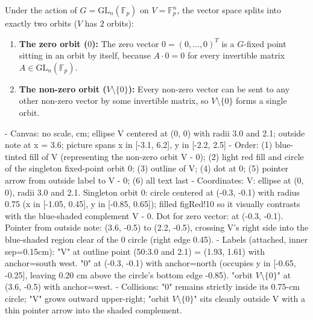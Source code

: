 \begin{content}
Under the action of $G = \mathrm{GL}_n(\mathbb{F}_p)$ on $V = \mathbb{F}_p^n$, the vector space splits into exactly two orbits ($V$ has $2$ orbits):
\begin{enumerate}[label=\textbf{\arabic*.}]
    \item \textbf{The zero orbit ($0$):} The zero vector $0 = (0, \dots, 0)^T$ is a $G$-fixed point sitting in an orbit by itself, because $A \cdot 0 = 0$ for every invertible matrix $A \in \mathrm{GL}_n(\mathbb{F}_p)$.
    \item \textbf{The non-zero orbit ($V \setminus \{0\}$):} Every non-zero vector can be sent to any other non-zero vector by some invertible matrix, so $V \setminus \{0\}$ forms a single orbit.
\end{enumerate}

\begin{hidden}
- Canvas: no scale, cm; ellipse V centered at (0, 0) with radii 3.0 and 2.1; outside note at x = 3.6; picture spans x in [-3.1, 6.2], y in [-2.2, 2.5]
- Order: (1) blue-tinted fill of V (representing the non-zero orbit V - {0}); (2) light red fill and circle of the singleton fixed-point orbit {0}; (3) outline of V; (4) dot at 0; (5) pointer arrow from outside label to V - {0}; (6) all text last
- Coordinates:
  V: ellipse at (0, 0), radii 3.0 and 2.1.
  Singleton orbit {0}: circle centered at (-0.3, -0.1) with radius 0.75 (x in [-1.05, 0.45], y in [-0.85, 0.65]); filled figRed!10 so it visually contrasts with the blue-shaded complement V - {0}.
  Dot for zero vector: at (-0.3, -0.1).
  Pointer from outside note: (3.6, -0.5) to (2.2, -0.5), crossing V's right side into the blue-shaded region clear of the {0} circle (right edge 0.45).
- Labels (attached, inner sep=0.15cm):
  "V" at outline point (50:3.0 and 2.1) = (1.93, 1.61) with anchor=south west.
  "0" at (-0.3, -0.1) with anchor=north (occupies y in [-0.65, -0.25], leaving 0.20 cm above the circle's bottom edge -0.85).
  "orbit $V \setminus \{0\}$" at (3.6, -0.5) with anchor=west.
- Collisions: "0" remains strictly inside its 0.75-cm circle; "V" grows outward upper-right; "orbit $V \setminus \{0\}$" sits cleanly outside V with a thin pointer arrow into the shaded complement.
\end{hidden}
\begin{center}
\end{center}
\end{content}
